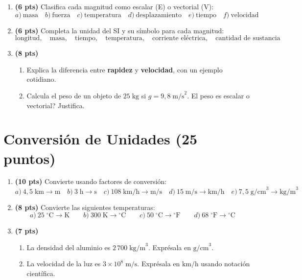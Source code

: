 \documentclass[12pt, letterpaper]{article}
\begin{document}
\begin{enumerate}[leftmargin=*]
  \item \textbf{(6 pts)} Clasifica cada magnitud como escalar (E) o vectorial (V):
        \[
          a)\ \text{masa} \quad b)\ \text{fuerza} \quad c)\ \text{temperatura} \quad d)\ \text{desplazamiento} \quad e)\ \text{tiempo} \quad f)\ \text{velocidad}
        \]

  \item \textbf{(6 pts)} Completa la unidad del SI y su símbolo para cada magnitud:
        \[
          \text{longitud}, \quad \text{masa}, \quad \text{tiempo}, \quad \text{temperatura}, \quad \text{corriente eléctrica}, \quad \text{cantidad de sustancia}
        \]

  \item \textbf{(8 pts)}
        \begin{enumerate}[label=\alph*)]
          \item Explica la diferencia entre \textbf{rapidez} y \textbf{velocidad}, con un ejemplo cotidiano.
          \item Calcula el peso de un objeto de $25\;\text{kg}$ si $g = 9{,}8\;\text{m/s}^2$. \textquestiondown El peso es escalar o vectorial? Justifica.
        \end{enumerate}
\end{enumerate}

\newpage

\section{Conversión de Unidades (25 puntos)}

\begin{enumerate}[leftmargin=*]
  \item \textbf{(10 pts)} Convierte usando factores de conversión:
        \[
          a)\ 4{,}5\;\text{km} \to \text{m} \quad b)\ 3\;\text{h} \to \text{s} \quad c)\ 108\;\text{km/h} \to \text{m/s} \quad d)\ 15\;\text{m/s} \to \text{km/h} \quad e)\ 7{,}5\;\text{g/cm}^3 \to \text{kg/m}^3
        \]

  \item \textbf{(8 pts)} Convierte las siguientes temperaturas:
        \[
          a)\ 25\;^\circ\text{C} \to \text{K} \qquad b)\ 300\;\text{K} \to {}^\circ\text{C} \qquad c)\ 50\;^\circ\text{C} \to {}^\circ\text{F} \qquad d)\ 68\;^\circ\text{F} \to {}^\circ\text{C}
        \]

  \item \textbf{(7 pts)}
        \begin{enumerate}[label=\alph*)]
          \item La densidad del aluminio es $2\,700\;\text{kg/m}^3$. Exprésala en $\text{g/cm}^3$.
          \item La velocidad de la luz es $3 \times 10^8\;\text{m/s}$. Exprésala en $\text{km/h}$ usando notación científica.
        \end{enumerate}
\end{enumerate}
\end{document}

